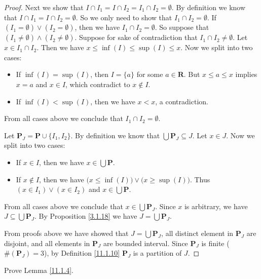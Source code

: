 \begin{proof}
    Next we show that \(I \cap I_1 = I \cap I_2 = I_1 \cap I_2 = \emptyset\).
    By definition we know that \(I \cap I_1 = I \cap I_2 = \emptyset\).
    So we only need to show that \(I_1 \cap I_2 = \emptyset\).
    If \((I_1 = \emptyset) \lor (I_2 = \emptyset)\), then we have \(I_1 \cap I_2 = \emptyset\).
    So suppose that \((I_1 \neq \emptyset) \land (I_2 \neq \emptyset)\).
    Suppose for sake of contradiction that \(I_1 \cap I_2 \neq \emptyset\).
    Let \(x \in I_1 \cap I_2\).
    Then we have \(x \leq \inf(I) \leq \sup(I) \leq x\).
    Now we split into two cases:
    \begin{itemize}
        \item If \(\inf(I) = \sup(I)\), then \(I = \{a\}\) for some \(a \in \mathbf{R}\).
              But \(x \leq a \leq x\) implies \(x = a\) and \(x \in I\), which contradict to \(x \notin I\).
        \item If \(\inf(I) < \sup(I)\), then we have \(x < x\), a contradiction.
    \end{itemize}
    From all cases above we conclude that \(I_1 \cap I_2 = \emptyset\).

    Let \(\mathbf{P}_J = \mathbf{P} \cup \{I_1, I_2\}\).
    By definition we know that \(\bigcup \mathbf{P}_J \subseteq J\).
    Let \(x \in J\).
    Now we split into two cases:
    \begin{itemize}
        \item If \(x \in I\), then we have \(x \in \bigcup \mathbf{P}\).
        \item If \(x \notin I\), then we have \(\big(x \leq \inf(I)\big) \lor \big(x \geq \sup(I)\big)\).
              Thus \((x \in I_1) \lor (x \in I_2)\) and \(x \in \bigcup \mathbf{P}\).
    \end{itemize}
    From all cases above we conclude that \(x \in \bigcup \mathbf{P}_J\).
    Since \(x\) is arbitrary, we have \(J \subseteq \bigcup \mathbf{P}_J\).
    By Proposition \ref{3.1.18} we have \(J = \bigcup \mathbf{P}_J\).

    From proofs above we have showed that \(J = \bigcup \mathbf{P}_J\), all distinct element in \(\mathbf{P}_J\) are disjoint, and all elements in \(\mathbf{P}_J\) are bounded interval.
    Since \(\mathbf{P}_J\) is finite (\(\#(\mathbf{P}_J) = 3\)), by Definition \ref{11.1.10} \(\mathbf{P}_J\) is a partition of \(J\).
\end{proof}

\exercisesection

\begin{exercise}\label{ex 11.1.1}
    Prove Lemma \ref{11.1.4}.
\end{exercise}

